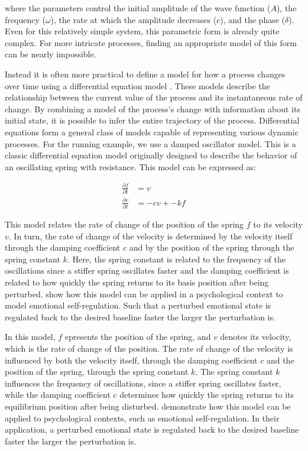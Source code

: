 \documentclass[man, floatsintext]{apa7}
\begin{document}
\noindent where the parameters control the initial amplitude of the wave
function ($A$),
the frequency ($\omega$), the rate at which the amplitude decreases ($c$), and
the phase ($\delta$). Even for this relatively simple system, this parametric
form is already quite complex. For more intricate processes, finding an
appropriate model of this form can be nearly impossible.

Instead it is often more practical to define a model for how a process changes
over
time using a differential equation model \parencite{cooper_dynamical_2012}.
These models describe the relationship between the current value of the process
and its instantaneous rate of change. By combining a model of the process's
change with information about its initial state, it is possible to infer the
entire trajectory of the process.
Differential equations form a general class of models capable of representing
various dynamic processes. For the running example, we use a damped oscillator
model. This is a classic differential equation model originally designed to
describe the
behavior of an oscillating spring with resistance. This model can be expressed
as:

\begin{equation}
  \begin{aligned}
    \frac{\partial f}{\partial t} & = v         \\
    \frac{\partial v}{\partial t} & = -cv + -kf
  \end{aligned}
\end{equation}

\noindent This model relates the rate of change of the position of the spring
$f$ to
its velocity $v$. In turn, the rate of change of the velocity is determined
by the velocity itself through the damping coefficient $c$ and by the
position of the spring through the spring constant $k$. Here, the spring
constant is related to the frequency of the oscillations since a stiffer
spring oscillates faster and the damping coefficient is related to how quickly
the spring returns to its basis position after being perturbed.
\textcite{chow_emotion_2005} show how this model can be applied in a
psychological context to model emotional self-regulation. Such that a perturbed
emotional state is regulated back to the desired baseline faster the larger
the perturbation is.

In this model, $f$ epresents the position of the spring, and $v$ denotes its
velocity, which is the rate of change of the position. The rate of change of
the velocity is influenced by both the velocity itself, through the damping
coefficient $c$ and the position of the spring, through the spring constant
$k$. The spring constant $k$ influences the frequency of oscillations, since a
stiffer spring oscillates faster, while the damping coefficient $c$
determines how quickly the spring returns to its equilibrium position after
being disturbed. \textcite{chow_emotion_2005} demonstrate how this model can be
applied to psychological contexts, such as emotional self-regulation. In their
application, a perturbed
emotional state is regulated back to the desired baseline faster the larger
the perturbation is.
\end{document}
